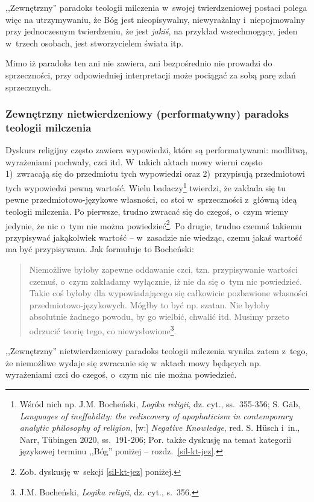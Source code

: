 ,,Zewnętrzny'' paradoks teologii milczenia w~swojej twierdzeniowej postaci polega więc na utrzymywaniu, że Bóg jest nieopisywalny, niewyrażalny i~niepojmowalny przy jednoczesnym twierdzeniu, że jest \textit{jakiś}, na przykład wszechmogący, jeden w~trzech osobach, jest stworzycielem świata itp.

Mimo iż paradoks ten ani nie zawiera, ani bezpośrednio nie prowadzi do sprzeczności, przy odpowiedniej interpretacji może pociągać za sobą parę zdań sprzecznych.


\subsubsection{Zewnętrzny nietwierdzeniowy (performatywny) paradoks teologii milczenia}

Dyskurs religijny często zawiera wypowiedzi, które są performatywami: modlitwą, wyrażeniami pochwały, czci itd. W~takich aktach mowy wierni często 1)~zwracają się do przedmiotu tych wypowiedzi oraz 2)~przypisują przedmiotowi tych wypowiedzi pewną wartość. Wielu badaczy\footnote{Wśród nich np. J.M. Bocheński, \textit{Logika religii}, dz. cyt., ss.~355-356; S. Gäb, \textit{Languages of ineffability: the rediscovery of apophaticism in contemporary analytic philosophy of religion}, [w:] \textit{Negative Knowledge}, red. S. Hüsch i~in., Narr, Tübingen 2020, ss.~191-206; Por. także dyskusję na temat kategorii językowej terminu ,,Bóg'' poniżej -- rozdz.~\ref{sil-kt-jez}.} twierdzi, że zakłada się tu pewne przedmiotowo-językowe własności, co stoi w~sprzeczności z~główną ideą teologii milczenia. Po pierwsze, trudno zwracać się do czegoś, o~czym wiemy jedynie, że nic o~tym nie można powiedzieć\footnote{Zob. dyskusję w~sekcji \ref{sil-kt-jez} poniżej.}. Po drugie, trudno czemuś takiemu przypisywać jakąkolwiek wartość -- w~zasadzie nie wiedząc, czemu jakaś wartość ma być przypisywana. Jak formułuje to Bocheński:

\begin{quote}
Niemożliwe byłoby zapewne oddawanie czci, tzn. przypisywanie wartości czemuś, o~czym zakładamy wyłącznie, iż nie da się o~tym nic powiedzieć. Takie coś byłoby dla wypowiadającego się całkowicie pozbawione własności przedmiotowo-językowych. Mógłby to być np. szatan. Nie byłoby absolutnie żadnego powodu, by go wielbić, chwalić itd. Musimy przeto odrzucić teorię tego, co niewysłowione\footnote{J.M. Bocheński, \textit{Logika religii}, dz. cyt., s.~356.}.
\end{quote}
,,Zewnętrzny'' nietwierdzeniowy paradoks teologii milczenia wynika zatem z~tego, że niemożliwe wydaje się zwracanie się w~aktach mowy będących np. wyrażeniami czci do czegoś, o~czym nic nie można powiedzieć.

